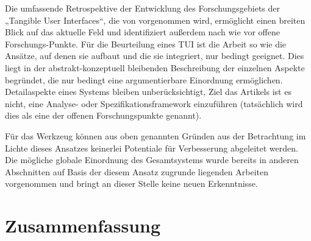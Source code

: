 Die umfassende Retrospektive der Entwicklung des Forschungsgebiets der „Tangible User Interfaces“, die von \citep{Ishii08} vorgenommen wird, ermöglicht einen breiten Blick auf das aktuelle Feld und identifiziert außerdem nach wie vor offene Forschungs-Punkte. Für die Beurteilung eines \gls{TUI} ist die Arbeit so wie die Ansätze, auf denen sie aufbaut und die sie integriert, nur bedingt geeignet. Dies liegt in der abstrakt-konzeptuell bleibenden Beschreibung der einzelnen Aspekte begründet, die nur bedingt eine argumentierbare Einordnung ermöglichen. Detailaspekte eines Systems bleiben unberücksichtigt, Ziel das Artikels ist es nicht, eine Analyse- oder Spezifikationsframework einzuführen (tatsächlich wird dies als eine der offenen Forschungspunkte genannt).

Für das Werkzeug können aus oben genannten Gründen aus der Betrachtung im Lichte dieses Ansatzes keinerlei Potentiale für 
Verbesserung abgeleitet werden. Die mögliche globale Einordnung des Gesamtsystems wurde bereits in anderen Abschnitten auf Basis der diesem Ansatz zugrunde liegenden Arbeiten vorgenommen und bringt an dieser Stelle keine neuen Erkenntnisse.


\section{Zusammenfassung}

